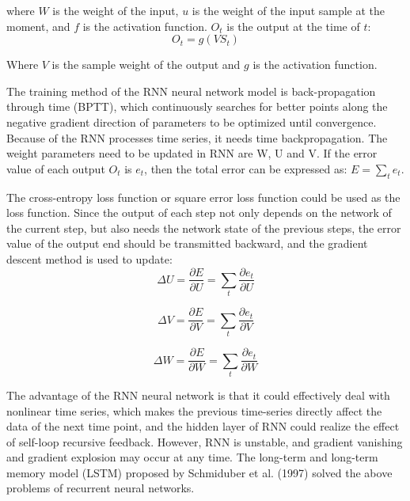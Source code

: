 where $W$ is the weight of the input, $u$ is the weight of the input sample at the moment, and $f$ is the activation function.
$O_ {t}$ is the output at the time of $t$:\\
\begin{equation}
O_ {t} = g (V S_{t})    
\end{equation}

Where $V$ is the sample weight of the output and $g$ is the activation function.

The training method of the RNN neural network model is back-propagation through time (BPTT), which continuously searches for better points along the negative gradient direction of parameters to be optimized until convergence. Because of the RNN processes time series, it needs time backpropagation. The weight parameters need to be updated in RNN are W, U and V. If the error value of each output $O_t$ is $e_t$, then the total error can be expressed as: $E = \sum_{t} e_t$.

The cross-entropy loss function or square error loss function could be used as the loss function. Since the output of each step not only depends on the network of the current step, but also needs the network state of the previous steps, the error value of the output end should be transmitted backward, and the gradient descent method is used to update:\\
\begin{equation}
 \Delta U = \frac{\partial E}{\partial U} = \sum_t \frac{\partial e_t}{\partial U}
\end{equation}

\begin{equation}
 \Delta V = \frac{\partial E}{\partial V} = \sum_t \frac{\partial e_t}{\partial V}
\end{equation}

\begin{equation}
 \Delta W = \frac{\partial E}{\partial W} = \sum_t \frac{\partial e_t}{\partial W}
\end{equation}

The advantage of the RNN neural network is that it could effectively deal with nonlinear time series, which makes the previous time-series directly affect the data of the next time point, and the hidden layer of RNN could realize the effect of self-loop recursive feedback. However, RNN is unstable, and gradient vanishing and gradient explosion may occur at any time. The long-term and long-term memory model (LSTM) proposed by Schmiduber et al. (1997) solved the above problems of recurrent neural networks.


